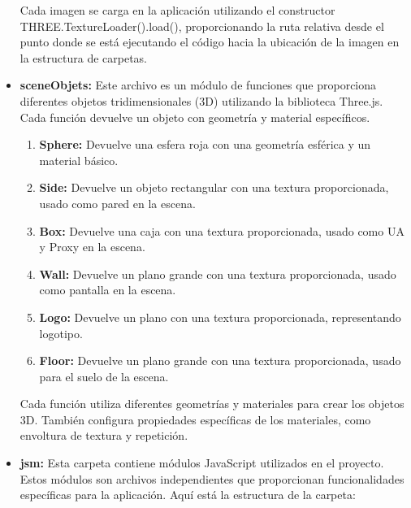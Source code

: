\documentclass[a4paper, 12pt]{book}
\begin{document}
\begin{itemize}
  Cada imagen se carga en la aplicación utilizando el constructor THREE.TextureLoader().load(), 
  proporcionando la ruta relativa desde el punto donde se está ejecutando el código hacia la ubicación de la imagen en la estructura de carpetas.

  \item \textbf{sceneObjets:} Este archivo es un módulo de funciones que proporciona diferentes objetos tridimensionales (3D) utilizando la biblioteca Three.js. 
  Cada función devuelve un objeto con geometría y material específicos.

  \begin{enumerate}
    \item \textbf{Sphere:} Devuelve una esfera roja con una geometría esférica y un material básico.
    \item \textbf{Side:} Devuelve un objeto rectangular con una textura proporcionada, usado como pared en la escena.
    \item \textbf{Box:} Devuelve una caja con una textura proporcionada, usado como UA y Proxy en la escena.
    \item \textbf{Wall:} Devuelve un plano grande con una textura proporcionada, usado como pantalla en la escena.
    \item \textbf{Logo:} Devuelve un plano con una textura proporcionada, representando logotipo.
    \item \textbf{Floor:} Devuelve un plano grande con una textura proporcionada, usado para el suelo de la escena.
  \end{enumerate}

  Cada función utiliza diferentes geometrías y materiales para crear los objetos 3D. 
  También configura propiedades específicas de los materiales, como envoltura de textura y repetición.
  
  \item \textbf{jsm:} Esta carpeta contiene módulos JavaScript utilizados en el proyecto. Estos módulos son archivos independientes que proporcionan funcionalidades específicas para la aplicación. 
  Aquí está la estructura de la carpeta:


\end{itemize}
\end{document}
